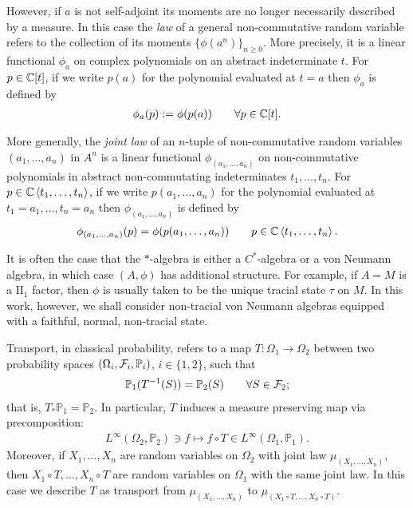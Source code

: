 However, if $a$ is not self-adjoint its moments are no longer necessarily described by a measure. In this case the \emph{law} of a general non-commutative random variable refers to the collection of its moments $\{\phi(a^n)\}_{n\geq 0}$. More precisely, it is a linear functional $\phi_a$ on complex polynomials on an abstract indeterminate $t$. For $p\in \mathbb{C}[t]$, if we write $p(a)$ for the polynomial evaluated at $t=a$ then $\phi_a$ is defined by
	\begin{align*}
		\phi_a(p):=\phi(p(a))\qquad \forall p\in \mathbb{C}[t].
	\end{align*}
	
More generally, the \emph{joint law} of an $n$-tuple of non-commutative random variables $(a_1,\ldots, a_n)$ in  $A^n$ is a linear functional $\phi_{(a_1,\ldots, a_n)}$ on non-commutative polynomials in abstract non-commutating indeterminates $t_1,\ldots, t_n$. For $p\in \mathbb{C}\left\langle t_1,\ldots, t_n\right\rangle$, if we write $p(a_1,\ldots, a_n)$ for the polynomial evaluated at $t_1=a_1,\ldots, t_n=a_n$ then $\phi_{(a_1,\ldots, a_n)}$ is defined by
	\begin{align*}
		\phi_{(a_1,\ldots, a_n)}(p)=\phi( p(a_1,\ldots, a_n))\qquad p\in \mathbb{C}\left\langle t_1,\ldots, t_n\right\rangle.
	\end{align*}

It is often the case that the $*$-algebra is either a $C^*$-algebra or a von Neumann algebra, in which case $(A,\phi)$ has additional structure. For example, if $A=M$ is a $\mathrm{II}_1$ factor, then $\phi$ is usually taken to be the unique tracial state $\tau$ on $M$. In this work, however, we shall consider non-tracial von Neumann algebras equipped with a faithful, normal, non-tracial state.

Transport, in classical probability, refers to a map $T\colon \Omega_1\to \Omega_2$ between two probability spaces $(\Omega_i,\mathcal{F}_i,\mathbb{P}_i)$, $i\in\{1,2\}$, such that
	\begin{align*}
		\mathbb{P}_1(T^{-1}(S))=\mathbb{P}_2(S)\qquad \forall S\in\mathcal{F}_2;
	\end{align*}
that is, $T_*\mathbb{P}_1=\mathbb{P}_2$. In particular, $T$ induces a measure preserving map via precomposition:
	\begin{align*}
		L^\infty(\Omega_2,\mathbb{P}_2)\ni f\mapsto f\circ T\in L^\infty(\Omega_1,\mathbb{P}_1).
	\end{align*}
Moreover, if $X_1,\ldots, X_n$ are random variables on $\Omega_2$ with joint law $\mu_{(X_1,\ldots, X_n)}$, then $X_1\circ T,\ldots, X_n\circ T$ are random variables on $\Omega_1$ with the same joint law. In this case we describe $T$ as transport from $\mu_{(X_1,\ldots, X_n)}$ to $\mu_{(X_1\circ T,\ldots, X_n\circ T)}$.

